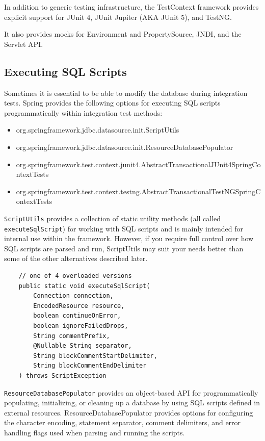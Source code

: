 \documentclass{scrartcl}
\begin{document}
In addition to generic testing infrastructure, the TestContext framework provides explicit support for JUnit 4, JUnit Jupiter (AKA JUnit 5), and TestNG.

It also provides mocks for Environment and PropertySource, JNDI, and the Servlet API.
\subsection{Executing SQL Scripts}

Sometimes it is essential to be able to modify the database during integration tests.
Spring provides the following options for executing SQL scripts programmatically within integration test methods:

\begin{itemize}
    \item org.springframework.jdbc.datasource.init.ScriptUtils
    \item org.springframework.jdbc.datasource.init.ResourceDatabasePopulator
    \item org.springframework.test.context.junit4.AbstractTransactionalJUnit4SpringContextTests
    \item org.springframework.test.context.testng.AbstractTransactionalTestNGSpringContextTests
\end{itemize}

\lstinline|ScriptUtils| provides a collection of static utility methods (all called \lstinline|executeSqlScript|) for working with SQL scripts and is mainly intended for internal use within the framework. However, if you require full control over how SQL scripts are parsed and run, ScriptUtils may suit your needs better than some of the other alternatives described later.

\begin{lstlisting}
    // one of 4 overloaded versions
    public static void executeSqlScript(
        Connection connection,
        EncodedResource resource,
        boolean continueOnError,
        boolean ignoreFailedDrops,
        String commentPrefix,
        @Nullable String separator,
        String blockCommentStartDelimiter,
        String blockCommentEndDelimiter
    ) throws ScriptException
\end{lstlisting}

\lstinline|ResourceDatabasePopulator| provides an object-based API for programmatically populating, initializing, or cleaning up a database by using SQL scripts defined in external resources. ResourceDatabasePopulator provides options for configuring the character encoding, statement separator, comment delimiters, and error handling flags used when parsing and running the scripts.
\end{document}
